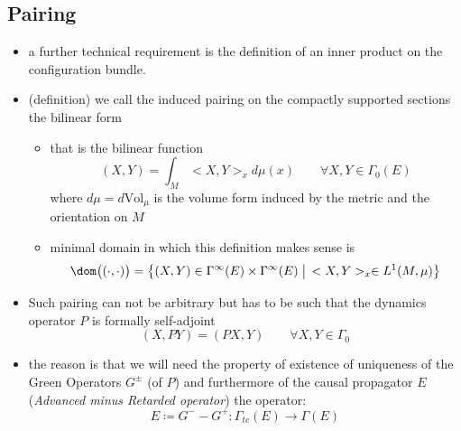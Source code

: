 \documentclass[a4paper,11pt]{scrartcl}
\begin{document}
    \subsection{Pairing}
    \begin{itemize}
        \item a further technical requirement is the definition of an inner product on the configuration bundle.
        \item (definition) we call the induced pairing  on the compactly supported sections the bilinear form
        \begin{itemize}
            \item         that is the bilinear function
            $$ (X,Y) = \int_M <X,Y>_x d\mu(x) \qquad \forall X, Y \in \Gamma_0(E)$$
               where $d\mu = d\textrm{Vol}_\mu$ is the volume form induced by the metric and the orientation on $M$
            \item minimal domain in which this definition makes sense is
            $$ \dom\big( (\cdot, \cdot) \big) =
                       \big\{(X,Y) \in \Gamma^\infty(E) \times \Gamma^\infty(E) \; \big\vert \,  <X,Y>_x \in L^1(M,\mu)\big \} $$
        \end{itemize}
        \item Such pairing can not be arbitrary but has to be such that the dynamics operator $P$  is formally self-adjoint
        $$(X,PY) = (PX,Y) \qquad \forall X,Y \in \Gamma_0$$
        \item the reason is that we will need the property of existence of uniqueness of the Green Operators $G^\pm$ (of $P$) and furthermore of the  causal propagator $E$ (\emph{Advanced minus Retarded operator}) the operator:
                $$
                    E \coloneqq G^-  - G^+ : \Gamma_{tc}(E) \rightarrow \Gamma(E)
                $$
    \end{itemize}
        

    
\end{document}
